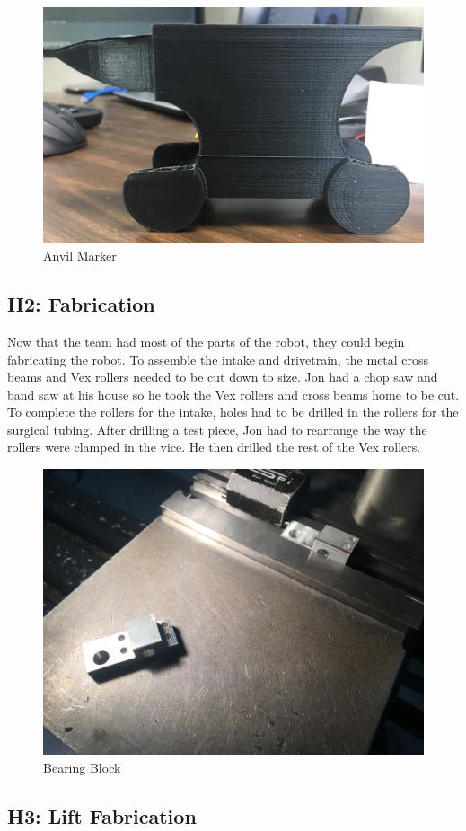 \documentclass{article}
\begin{document}
\begin{figure}
    \centering
    \includegraphics[width=.6 \textwidth]{09_10-29/images/anvil_marker.jpg}
    \caption{Anvil Marker}
    \label{fig:marker}
\end{figure}

\subsection{H2: Fabrication}

Now that the team had most of the parts of the robot, they could begin fabricating the robot. To assemble the intake and drivetrain, the metal cross beams and Vex rollers needed to be cut down to size. Jon had a chop saw and band saw at his house so he took the Vex rollers and cross beams home to be cut. To complete the rollers for the intake, holes had to be drilled in the rollers for the surgical tubing. After drilling a test piece, Jon had to rearrange the way the rollers were clamped in the vice. He then drilled the rest of the Vex rollers.

\begin{figure}
    \centering
    \includegraphics[width=.6 \textwidth]{09_10-29/images/bearingblock.JPG}
    \caption{Bearing Block}
    \label{fig:bearingblock}
\end{figure}


\subsection{H3: Lift Fabrication}
\end{document}
